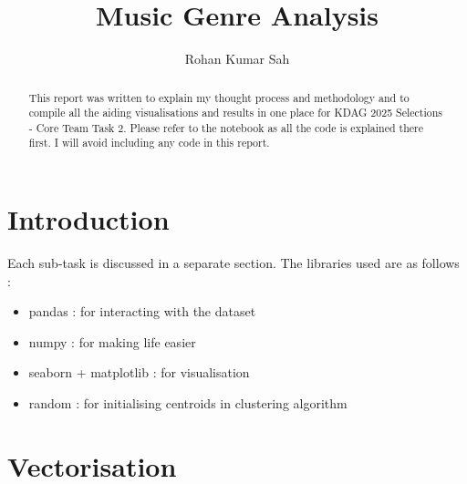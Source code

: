 \documentclass{article}
\title{Music Genre Analysis}
\author{Rohan Kumar Sah}
\begin{document}
\maketitle

\begin{abstract}
This report was written to explain my thought process and methodology and to compile all the aiding visualisations and results in one place for KDAG 2025 Selections - Core Team Task 2. Please refer to the notebook as all the code is explained there first. I will avoid including any code in this report.
\end{abstract}

\section{Introduction}

Each sub-task is discussed in a separate section.
The libraries used are as follows : 
\begin{itemize}
\item pandas : for interacting with the dataset
\item numpy : for making life easier
\item seaborn + matplotlib : for visualisation
\item random : for initialising centroids in clustering algorithm
\end{itemize}

\section{Vectorisation}
\end{document}
